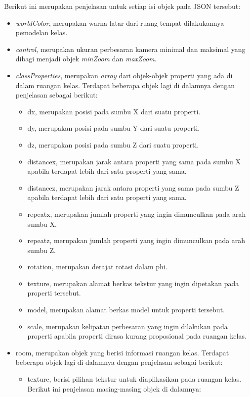 Berikut ini merupakan penjelasan untuk setiap isi objek pada JSON tersebut:
\begin{itemize}
	\item {\it worldColor}, merupakan warna latar dari ruang tempat dilakukannya pemodelan kelas.
	\item {\it control}, merupakan ukuran perbesaran kamera minimal dan maksimal yang dibagi menjadi objek {\it minZoom} dan {\it maxZoom}.
	\item {\it classProperties}, merupakan {\it array} dari objek-objek properti yang ada di dalam ruangan kelas. Terdapat beberapa objek lagi di dalamnya dengan penjelasan sebagai berikut:
	\begin{itemize}
		\item dx, merupakan posisi pada sumbu X dari suatu properti.
		\item dy, merupakan posisi pada sumbu Y dari suatu properti.
		\item dz, merupakan posisi pada sumbu Z dari suatu properti.
		\item distancex, merupakan jarak antara properti yang sama pada sumbu X apabila terdapat lebih dari satu properti yang sama.
		\item distancez, merupakan jarak antara properti yang sama pada sumbu Z apabila terdapat lebih dari satu properti yang sama. 
		\item repeatx, merupakan jumlah properti yang ingin dimunculkan pada arah sumbu X.
		\item repeatz, merupakan jumlah properti yang ingin dimunculkan pada arah sumbu Z.
		\item rotation, merupakan derajat rotasi dalam phi.
		\item texture, merupakan alamat berkas tekstur yang ingin dipetakan pada properti tersebut.
		\item model, merupakan alamat berkas model untuk properti tersebut.
		\item scale, merupakan kelipatan perbesaran yang ingin dilakukan pada properti apabila properti dirasa kurang proposional pada ruangan kelas.
	\end{itemize}
	\item room, merupakan objek yang berisi informasi ruangan kelas. Terdapat beberapa objek lagi di dalamnya dengan penjelasan sebagai berikut:
		\begin{itemize}
			\item texture, berisi pilihan tekstur untuk diaplikasikan pada ruangan kelas. Berikut ini penjelasan masing-masing objek di dalamnya:

\end{itemize}
\end{itemize}
